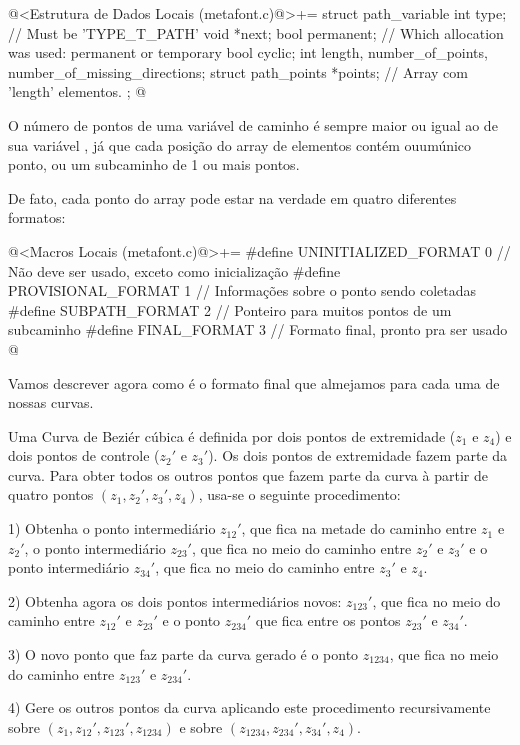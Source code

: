 \iniciocodigo
@<Estrutura de Dados Locais (metafont.c)@>+=
struct path_variable{
  int type; // Must be 'TYPE_T_PATH'
  void *next;
  bool permanent; // Which allocation was used: permanent or temporary
  bool cyclic;
  int length, number_of_points, number_of_missing_directions;
  struct path_points *points; // Array com 'length' elementos.
};
@
\fimcodigo

O número de pontos de uma variável de caminho é sempre maior ou igual
ao de sua variável , já que cada posição do array
de  elementos contém ouumúnico ponto, ou um
subcaminho de 1 ou mais pontos.

De fato, cada ponto do array pode estar na verdade em quatro diferentes
formatos:

\iniciocodigo
@<Macros Locais (metafont.c)@>+=
#define UNINITIALIZED_FORMAT 0 // Não deve ser usado, exceto como inicialização
#define PROVISIONAL_FORMAT   1 // Informações sobre o ponto sendo coletadas
#define SUBPATH_FORMAT       2 // Ponteiro para muitos pontos de um subcaminho
#define FINAL_FORMAT         3 // Formato final, pronto pra ser usado
@
\fimcodigo

Vamos descrever agora como é o formato final que almejamos para cada
uma de nossas curvas.

Uma Curva de Beziér cúbica é definida por dois pontos de extremidade
($z_1$ e $z_4$) e dois pontos de controle ($z_2'$ e $z_3'$). Os dois
pontos de extremidade fazem parte da curva. Para obter todos os outros
pontos que fazem parte da curva à partir de quatro pontos $(z_1, z_2',
z_3', z_4)$, usa-se o seguinte procedimento:

1) Obtenha o ponto intermediário $z_{12}'$, que fica na metade do
caminho entre $z_1$ e $z_2'$, o ponto intermediário $z_{23}'$, que
fica no meio do caminho entre $z_2'$ e $z_3'$ e o ponto intermediário
$z_{34}'$, que fica no meio do caminho entre $z_3'$ e $z_4$.

2) Obtenha agora os dois pontos intermediários novos: $z_{123}'$, que
fica no meio do caminho entre $z_{12}'$ e $z_{23}'$ e o ponto
$z_{234}'$ que fica entre os pontos $z_{23}'$ e $z_{34}'$.

3) O novo ponto que faz parte da curva gerado é o ponto $z_{1234}$,
que fica no meio do caminho entre $z_{123}'$ e $z_{234}'$.

4) Gere os outros pontos da curva aplicando este procedimento
recursivamente sobre $(z_1, z_{12}', z_{123}', z_{1234})$ e sobre
$(z_{1234}, z_{234}', z_{34}', z_4)$.

